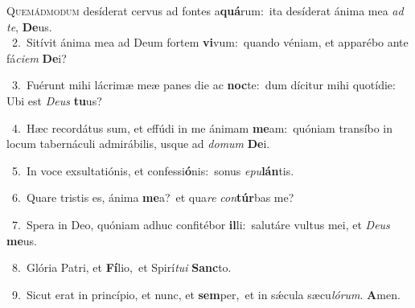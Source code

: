 \lettrine{\initial\textcolor{\initialcolor}{Q}}{uemádmodum} desíderat cervus ad fontes a\-\textbf{quá}\-rum:~\star ita desíderat ánima mea \textit{ad} \textit{te}\-, \textbf{De}\-us.\\
{\numbfont\textcolor{\numbcolor}{~2.}}~Sitívit ánima mea ad Deum fortem \textbf{vi}\-vum:~\star quando véniam, et apparébo ante fá\-\textit{ci}\-\textit{em} \textbf{De}\-i?\par
{\numbfont\textcolor{\numbcolor}{~3.}}~Fuérunt mihi lácrimæ meæ panes die ac \textbf{noc}\-te:~\star dum dícitur mihi quotídie: Ubi est \textit{De}\-\textit{us} \textbf{tu}\-us?\par
{\numbfont\textcolor{\numbcolor}{~4.}}~Hæc recordátus sum, et effúdi in me ánimam \textbf{me}\-am:~\star quóniam transíbo in locum tabernáculi admirábilis, usque ad \textit{do}\-\textit{mum} \textbf{De}\-i.\par
{\numbfont\textcolor{\numbcolor}{~5.}}~In voce exsultatiónis, et confessi\-\textbf{ó}\-nis:~\star sonus \textit{e}\-\textit{pu}\textbf{lán}tis.\par
{\numbfont\textcolor{\numbcolor}{~6.}}~Quare tristis es, ánima \textbf{me}\-a?~\star et qua\textit{re} \textit{con}\-\textbf{túr}bas me?\par
{\numbfont\textcolor{\numbcolor}{~7.}}~Spera in Deo, quóniam adhuc confitébor \textbf{il}\-li:~\star salutáre vultus mei, et \textit{De}\-\textit{us} \textbf{me}\-us.\par
{\numbfont\textcolor{\numbcolor}{~8.}}~Glória Patri, et \textbf{Fí}\-lio,~\star et Spirí\-\textit{tu}\-\textit{i} \textbf{Sanc}\-to.\par
{\numbfont\textcolor{\numbcolor}{~9.}}~Sicut erat in princípio, et nunc, et \textbf{sem}\-per,~\star et in sǽcula sæcu\-\textit{ló}\-\textit{rum}. \textbf{A}\-men.\par
